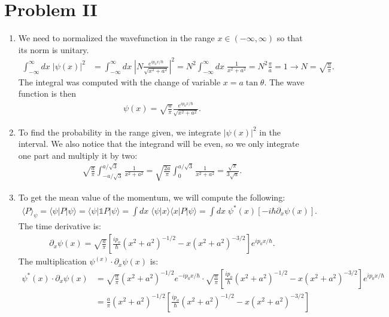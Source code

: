\documentclass[letterpaper,11pt,twoside]{article}
\newcommand{\braket}[1]{\langle#1\rangle}
\begin{document}
\section*{Problem II}
\begin{enumerate}[itemsep=0pt,topsep=0pt,label=\alph*.]
  \item We need to normalized the wavefunction in the range $x\in(-\infty,\infty)$ so that its norm is unitary.
  \begin{align*}
    \int_{-\infty}^\infty dx\;|\psi(x)|^2&=\int_{-\infty}^\infty dx\;\left|N\frac{e^{ip_0x/\hbar}}{\sqrt{x^2+a^2}}\right|^2=N^2\int_{-\infty}^\infty dx\;\frac{1}{x^2+a^2}=N^2\frac{\pi}{a}=1\longrightarrow N=\sqrt{\frac{a}{\pi}}.
  \end{align*}
  The integral was computed with the change of variable $x=a\tan\theta$. The wave function is then
  \begin{align*}
    \psi(x)=\sqrt{\frac{a}{\pi}}\frac{e^{ip_0x/\hbar}}{\sqrt{x^2+a^2}}.
  \end{align*}
  \item To find the probability in the range given, we integrate $|\psi(x)|^2$ in the interval. We also notice that the integrand will be even, so we only integrate one part and multiply it by two:
  \begin{align*}
    \sqrt{\frac{a}{\pi}}\int_{-a/\sqrt{3}}^{a/\sqrt{3}}\frac{1}{x^2+a^2}=\sqrt{\frac{2a}{\pi}}\int_{0}^{a/\sqrt{3}}\frac{1}{x^2+a^2}=\frac{\sqrt{\pi}}{3\sqrt{a}}.
  \end{align*}
  \item To get the mean value of the momentum, we will compute the following:
  \begin{align*}
    \braket{P}_\psi=\braket{\psi|P|\psi}=\braket{\psi|\mathds{1}P|\psi}=\int dx\;\braket{\psi|x}\braket{x|P|\psi}=\int dx\;\psi^*(x)[-i\hbar\partial_x\psi(x)].
  \end{align*}
  The time derivative is:
  \begin{align*}
    \partial_x\psi(x)=\sqrt{\frac{a}{\pi}}\left[\frac{ip_o}{\hbar}(x^2+a^2)^{-1/2}-x(x^2+a^2)^{-3/2}\right]e^{ip_0x/\hbar}.
  \end{align*}
  The multiplication $\psi^(x)\cdot\partial_x\psi(x)$ is:
  \begin{align*}
    \psi^*(x)\cdot\partial_x\psi(x)&=\sqrt{\frac{a}{\pi}}(x^2+a^2)^{-1/2}e^{-ip_0x/\hbar}\cdot\sqrt{\frac{a}{\pi}}\left[\frac{ip_o}{\hbar}(x^2+a^2)^{-1/2}-x(x^2+a^2)^{-3/2}\right]e^{ip_0x/\hbar}\\
    &=\frac{a}{\pi}(x^2+a^2)^{-1/2}\left[\frac{ip_o}{\hbar}(x^2+a^2)^{-1/2}-x(x^2+a^2)^{-3/2}\right]\\

\end{align*}
\end{enumerate}
\end{document}
